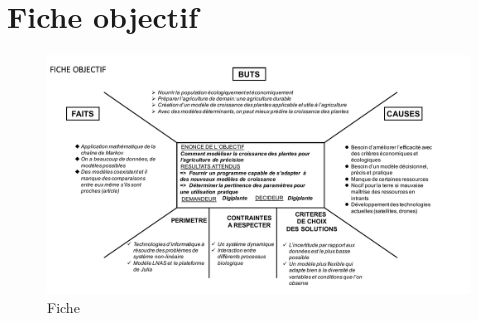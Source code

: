 \section{Fiche objectif}
\begin{figure}[h]
  \includegraphics[scale=0.51]{./annexes/fiche_objectif.pdf}
  \caption{Fiche}
  \label{fig:fiche_objectif}
\end{figure}